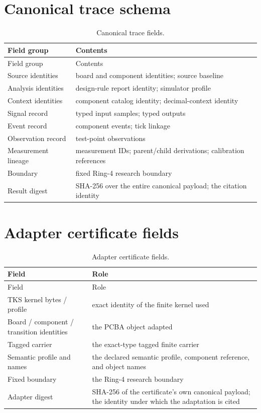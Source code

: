 \section{Canonical trace schema}\label{appA:trace}

\begin{longtable}{@{}ll@{}}
\caption{Canonical trace fields.}\label{appA:tracetable}\\
\toprule
Field group & Contents \\
\midrule
\endfirsthead
\toprule
Field group & Contents \\
\midrule
\endhead
\bottomrule
\endfoot
Source identities & board and component identities; source baseline \\
Analysis identities & design-rule report identity; simulator profile \\
Context identities & component catalog identity; decimal-context identity \\
Signal record & typed input samples; typed outputs \\
Event record & component events; tick linkage \\
Observation record & test-point observations \\
Measurement lineage & measurement IDs; parent/child derivations; calibration references \\
Boundary & fixed Ring-4 research boundary \\
Result digest & SHA-256 over the entire canonical payload; the citation identity \\
\end{longtable}

\section{Adapter certificate fields}\label{appA:adapter}

\begin{longtable}{@{}ll@{}}
\caption{Adapter certificate fields.}\label{appA:adaptertable}\\
\toprule
Field & Role \\
\midrule
\endfirsthead
\toprule
Field & Role \\
\midrule
\endhead
\bottomrule
\endfoot
TKS kernel bytes / profile & exact identity of the finite kernel used \\
Board / component / transition identities & the PCBA object adapted \\
Tagged carrier & the exact-type tagged finite carrier \\
Semantic profile and names & the declared semantic profile, component reference, and object names \\
Fixed boundary & the Ring-4 research boundary \\
Adapter digest & SHA-256 of the certificate's own canonical payload; the identity under which the adaptation is cited \\
\end{longtable}
